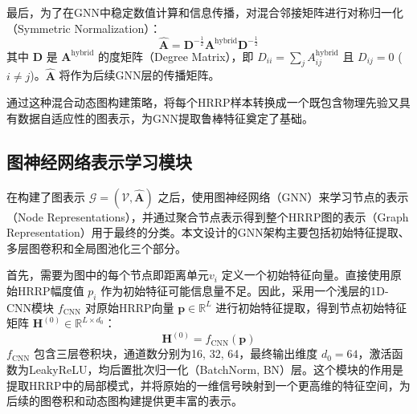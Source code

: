 最后，为了在GNN中稳定数值计算和信息传播，对混合邻接矩阵进行对称归一化（Symmetric Normalization）：
\begin{equation}
    \hat{\mathbf{A}} = \mathbf{D}^{-\frac{1}{2}} \mathbf{A}^{\text{hybrid}} \mathbf{D}^{-\frac{1}{2}}
    \label{eq:normalized_adjacency}
\end{equation}
其中 $\mathbf{D}$ 是 $\mathbf{A}^{\text{hybrid}}$ 的度矩阵（Degree Matrix），即 $D_{ii} = \sum_j A^{\text{hybrid}}_{ij}$ 且 $D_{ij}=0$ ($i \neq j$)。$\hat{\mathbf{A}}$ 将作为后续GNN层的传播矩阵。

通过这种混合动态图构建策略，将每个HRRP样本转换成一个既包含物理先验又具有数据自适应性的图表示，为GNN提取鲁棒特征奠定了基础。

\subsection{图神经网络表示学习模块}
\label{subsec:gnn_module}

在构建了图表示 $\mathcal{G} = (\mathcal{V}, \hat{\mathbf{A}})$ 之后，使用图神经网络（GNN）来学习节点的表示（Node Representations），并通过聚合节点表示得到整个HRRP图的表示（Graph Representation）用于最终的分类。本文设计的GNN架构主要包括初始特征提取、多层图卷积和全局图池化三个部分。

首先，需要为图中的每个节点即距离单元$v_i$ 定义一个初始特征向量。直接使用原始HRRP幅度值 $p_i$ 作为初始特征可能信息量不足。因此，采用一个浅层的1D-CNN模块 $f_{\text{CNN}}$ 对原始HRRP向量 $\mathbf{p} \in \mathbb{R}^{L}$ 进行初始特征提取，得到节点初始特征矩阵 $\mathbf{H}^{(0)} \in \mathbb{R}^{L \times d_0}$：
\begin{equation}
    \mathbf{H}^{(0)} = f_{\text{CNN}}(\mathbf{p})
    \label{eq:initial_features}
\end{equation}
$f_{\text{CNN}}$ 包含三层卷积块，通道数分别为16, 32, 64，最终输出维度 $d_0=64$，激活函数为LeakyReLU，均后置批次归一化（BatchNorm, BN）层。这个模块的作用是提取HRRP中的局部模式，并将原始的一维信号映射到一个更高维的特征空间，为后续的图卷积和动态图构建提供更丰富的表示。

